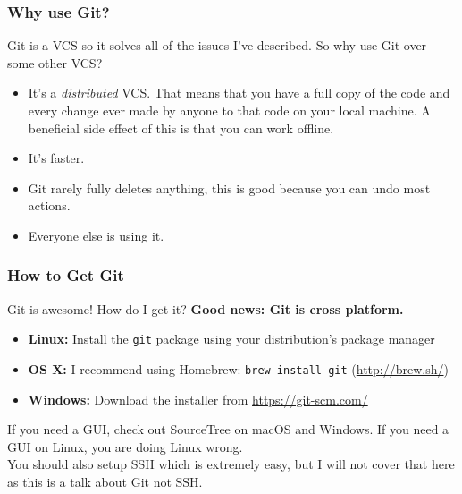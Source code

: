 \documentclass{lug}
\begin{document}
\begin{frame}
    \frametitle{Why use Git?}

    Git is a VCS so it solves all of the issues I've described. So why use Git over some other
    VCS?\footnotemark

    \begin{itemize}[<+->]
        \item It's a \textit{distributed} VCS. That means that you have a full copy of the code and
            every change ever made by anyone to that code on your local machine. A beneficial side
            effect of this is that you can work offline.
        \item It's faster.
        \item Git rarely fully deletes anything, this is good because you can undo most actions.
        \item Everyone else is using it.
    \end{itemize}

\end{frame}

\begin{frame}
    \frametitle{How to Get Git}

    Git is awesome! How do I get it? \textbf{Good news: Git is cross platform.}

    \begin{itemize}
        \item \textbf{Linux:} Install the \texttt{git} package using your distribution's package
            manager
        \item \textbf{OS X:} I recommend using Homebrew: \texttt{brew install git}
            (\url{http://brew.sh/})
        \item \textbf{Windows:} Download the installer from \url{https://git-scm.com/}
    \end{itemize}

    If you need a GUI, check out SourceTree on macOS and Windows. If you need a GUI on Linux, you
    are doing Linux wrong.\\

    You should also setup SSH which is extremely easy, but I will not cover that here as this is a
    talk about Git not SSH.
\end{frame}
\end{document}
